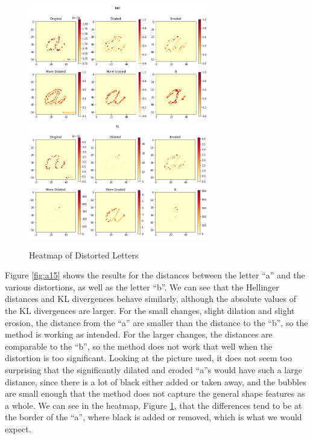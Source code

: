 \documentclass{article}
\begin{document}
\begin{figure}[h!]
\begin{center}
\includegraphics[width=0.7\textwidth]{hell-a.png}
\includegraphics[width=0.7\textwidth]{kl-a.png}
\caption{Heatmap of Distorted Letters}
\label{fig:aheat}
\end{center}
\end{figure}

Figure \ref{fig:a15} shows the results for the distances between the letter
``a'' and the various distortions, as well as the letter ``b''. We can see that
the Hellinger distances and KL divergences behave similarly, although the
absolute values of the KL divergences are larger. For the small changes, slight
dilation and slight erosion, the distance from the ``a'' are smaller than the
distance to the ``b'', so the method is working as intended. For the larger
changes, the distances are comparable to the ``b'', so the method does not work
that well when the distortion is too significant. Looking at the picture used,
it does not seem too surprising that the significantly dilated and eroded
``a''s would have such a large distance, since there is a lot of black either
added or taken away, and the bubbles are small enough that the method does not
capture the general shape features as a whole. We can see in the heatmap,
Figure \ref{fig:aheat}, that the differences tend to be at the border of the
``a'', where black is added or removed, which is what we would expect.
\end{document}
